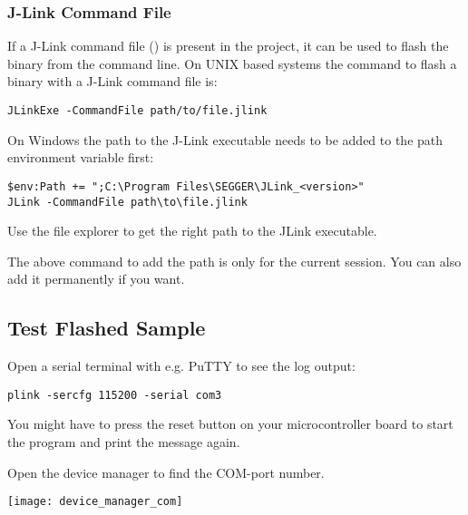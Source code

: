 \subsubsection{J-Link Command File}
If a J-Link command file () is present in the project, it can be used to flash the binary from the command line.
On UNIX based systems the command to flash a binary with a J-Link command file is:

\begin{lstlisting}
JLinkExe -CommandFile path/to/file.jlink
\end{lstlisting}

On Windows the path to the J-Link executable needs to be added to the path environment variable first:

\begin{lstlisting}
$env:Path += ";C:\Program Files\SEGGER\JLink_<version>"
JLink -CommandFile path\to\file.jlink
\end{lstlisting}

\begin{infobox}
  Use the file explorer to get the right path to the JLink executable.
\end{infobox}

\begin{infobox}
  The above command to add the path is only for the current session.
  You can also add it permanently if you want.
\end{infobox}

\subsection{Test Flashed Sample}

Open a serial terminal with e.g. PuTTY to see the log output:

\begin{lstlisting}
plink -sercfg 115200 -serial com3
\end{lstlisting}

You might have to press the reset button on your microcontroller board to start the program and print the message again.

\begin{infobox}
  Open the device manager to find the COM-port number.
  \begin{center}
    \texttt{[image: device\_manager\_com]}
  \end{center}
\end{infobox}

\newpage

